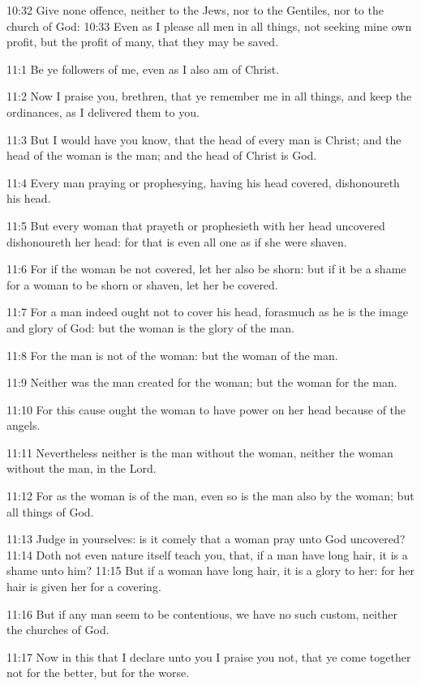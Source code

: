 10:32 Give none offence, neither to the Jews, nor to the Gentiles, nor to the church of God: 10:33 Even as I please all men in all things, not seeking mine own profit, but the profit of many, that they may be saved.

11:1 Be ye followers of me, even as I also am of Christ.

11:2 Now I praise you, brethren, that ye remember me in all things, and keep the ordinances, as I delivered them to you.

11:3 But I would have you know, that the head of every man is Christ; and the head of the woman is the man; and the head of Christ is God.

11:4 Every man praying or prophesying, having his head covered, dishonoureth his head.

11:5 But every woman that prayeth or prophesieth with her head uncovered dishonoureth her head: for that is even all one as if she were shaven.

11:6 For if the woman be not covered, let her also be shorn: but if it be a shame for a woman to be shorn or shaven, let her be covered.

11:7 For a man indeed ought not to cover his head, forasmuch as he is the image and glory of God: but the woman is the glory of the man.

11:8 For the man is not of the woman: but the woman of the man.

11:9 Neither was the man created for the woman; but the woman for the man.

11:10 For this cause ought the woman to have power on her head because of the angels.

11:11 Nevertheless neither is the man without the woman, neither the woman without the man, in the Lord.

11:12 For as the woman is of the man, even so is the man also by the woman; but all things of God.

11:13 Judge in yourselves: is it comely that a woman pray unto God uncovered?  11:14 Doth not even nature itself teach you, that, if a man have long hair, it is a shame unto him?  11:15 But if a woman have long hair, it is a glory to her: for her hair is given her for a covering.

11:16 But if any man seem to be contentious, we have no such custom, neither the churches of God.

11:17 Now in this that I declare unto you I praise you not, that ye come together not for the better, but for the worse.

